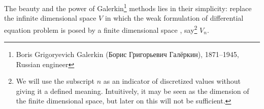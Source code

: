 The beauty and the power of Galerkin\footnote{Boris Grigoryevich
  Galerkin (Борис Григорьевич Галёркин), 1871--1945, Russian engineer}
methods lies in their simplicity: replace the infinite dimensional
space $V$ in which the weak formulation of differential equation
problem is posed by a finite dimensional space , say\footnote{We will
  use the subscript $n$ as an indicator of discretized values without
  giving it a defined meaning. Intuitively, it may be seen as the
  dimension of the finite dimensional space, but later on this will
  not be sufficient.} $V_n$.
